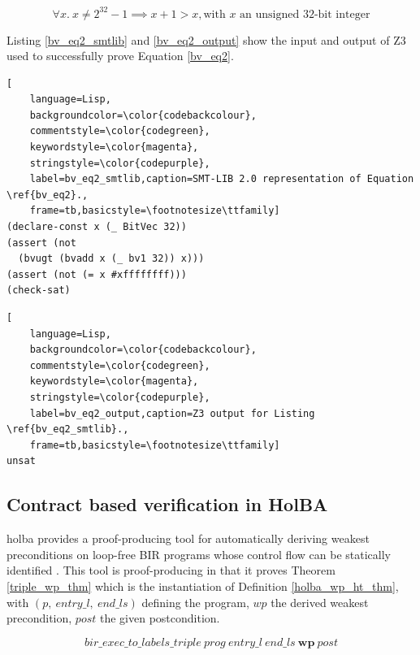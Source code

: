 \documentclass{kththesis}
\begin{document}
\begin{equation}
    \forall x.~ x \neq 2^{32}-1 \implies x+1>x, \text{with $x$ an unsigned 32-bit integer}
    \label{bv_eq2}
\end{equation}

Listing \ref{bv_eq2_smtlib} and \ref{bv_eq2_output} show the input and output of Z3 used to successfully prove Equation \ref{bv_eq2}.

\begin{lstlisting}[
    language=Lisp,
    backgroundcolor=\color{codebackcolour},
    commentstyle=\color{codegreen},
    keywordstyle=\color{magenta},
    stringstyle=\color{codepurple},
    label=bv_eq2_smtlib,caption=SMT-LIB 2.0 representation of Equation \ref{bv_eq2}.,
    frame=tb,basicstyle=\footnotesize\ttfamily]
(declare-const x (_ BitVec 32))
(assert (not
  (bvugt (bvadd x (_ bv1 32)) x)))
(assert (not (= x #xffffffff)))
(check-sat)
\end{lstlisting}

\begin{lstlisting}[
    language=Lisp,
    backgroundcolor=\color{codebackcolour},
    commentstyle=\color{codegreen},
    keywordstyle=\color{magenta},
    stringstyle=\color{codepurple},
    label=bv_eq2_output,caption=Z3 output for Listing \ref{bv_eq2_smtlib}.,
    frame=tb,basicstyle=\footnotesize\ttfamily]
unsat
\end{lstlisting}

\subsection{Contract based verification in HolBA} \label{contract-verif-holba}

\gls{holba} provides a proof-producing tool for automatically deriving weakest preconditions on loop-free \gls{BIR} programs whose control flow can be statically identified \cite{lindner_trabin:_2019}. This tool is proof-producing in that it proves Theorem \ref{triple_wp_thm} which is the instantiation of Definition \ref{holba_wp_ht_thm}, with $(p,~entry\_l,~end\_ls)$ defining the program, $wp$ the derived weakest precondition, $post$ the given postcondition.

\begin{equation}
    bir\_exec\_to\_labels\_triple~prog~entry\_l~end\_ls~\mathbf{wp}~post
    \label{triple_wp_thm}
\end{equation}
\end{document}

